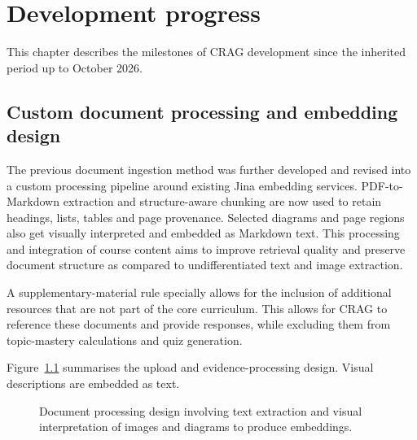 \chapter{Development progress}
This chapter describes the milestones of CRAG development since the inherited period up to October 2026.

\section{Custom document processing and embedding design}
The previous document ingestion method was further developed and revised into a custom processing pipeline around existing Jina embedding services. PDF-to-Markdown extraction and structure-aware chunking are now used to retain headings, lists, tables and page provenance. Selected diagrams and page regions also get visually interpreted and embedded as Markdown text. This processing and integration of course content aims to improve retrieval quality and preserve document structure as compared to undifferentiated text and image extraction.

A supplementary-material rule specially allows for the inclusion of additional resources that are not part of the core curriculum. This allows for CRAG to reference these documents and provide responses, while excluding them from topic-mastery calculations and quiz generation.

Figure~\ref{fig:ingestion} summarises the upload and evidence-processing design. Visual descriptions are embedded as text.
\begin{figure}[htbp]
\centering
{}
\caption{Document processing design involving text extraction and visual interpretation of images and diagrams to produce embeddings.}
\label{fig:ingestion}
\end{figure}

